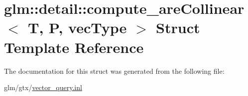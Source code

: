 \hypertarget{structglm_1_1detail_1_1compute__areCollinear}{\section{glm\-:\-:detail\-:\-:compute\-\_\-are\-Collinear$<$ T, P, vec\-Type $>$ Struct Template Reference}
\label{structglm_1_1detail_1_1compute__areCollinear}
}


The documentation for this struct was generated from the following file\-:\begin{DoxyCompactItemize}
\item 
glm/gtx/\hyperlink{vector__query_8inl}{vector\-\_\-query.\-inl}\end{DoxyCompactItemize}
